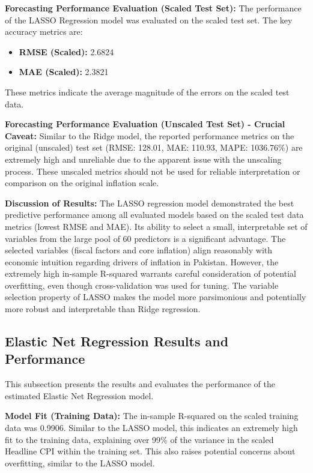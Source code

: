 \documentclass[12pt,a4paper]{article}
\begin{document}
\textbf{Forecasting Performance Evaluation (Scaled Test Set):}
The performance of the LASSO Regression model was evaluated on the scaled test set. The key accuracy metrics are:
\begin{itemize}
    \item \textbf{RMSE (Scaled):} 2.6824
    \item \textbf{MAE (Scaled):} 2.3821
\end{itemize}
These metrics indicate the average magnitude of the errors on the scaled test data.

\textbf{Forecasting Performance Evaluation (Unscaled Test Set) - Crucial Caveat:}
Similar to the Ridge model, the reported performance metrics on the original (unscaled) test set (RMSE: 128.01, MAE: 110.93, MAPE: 1036.76\%) are extremely high and unreliable due to the apparent issue with the unscaling process. These unscaled metrics should not be used for reliable interpretation or comparison on the original inflation scale.

\textbf{Discussion of Results:}
The LASSO regression model demonstrated the best predictive performance among all evaluated models based on the scaled test data metrics (lowest RMSE and MAE). Its ability to select a small, interpretable set of variables from the large pool of 60 predictors is a significant advantage. The selected variables (fiscal factors and core inflation) align reasonably with economic intuition regarding drivers of inflation in Pakistan. However, the extremely high in-sample R-squared warrants careful consideration of potential overfitting, even though cross-validation was used for tuning. The variable selection property of LASSO makes the model more parsimonious and potentially more robust and interpretable than Ridge regression.

\subsection{Elastic Net Regression Results and Performance}

This subsection presents the results and evaluates the performance of the estimated Elastic Net Regression model.

\textbf{Model Fit (Training Data):}
The in-sample R-squared on the scaled training data was 0.9906. Similar to the LASSO model, this indicates an extremely high fit to the training data, explaining over 99\% of the variance in the scaled Headline CPI within the training set. This also raises potential concerns about overfitting, similar to the LASSO model.
\end{document}
